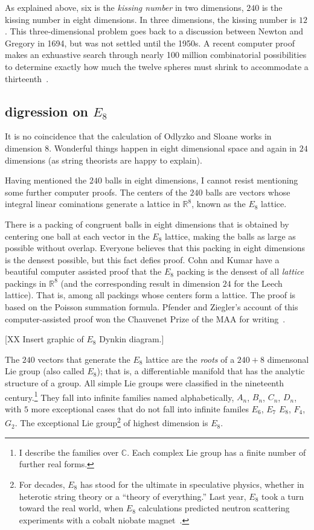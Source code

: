 \documentclass{llncs}
\newcommand{\ring}[1]{\mathbb{#1}}
\begin{document}
As explained above, six is the {\it kissing number} in two dimensions,
$240$ is the kissing number in eight dimensions. In three dimensions,
the kissing number is $12$.  This three-dimensional problem goes back
to a discussion between Newton and Gregory in 1694, but was not
settled until the 1950s.  A recent computer proof makes an exhuastive
search through nearly 100 million combinatorial possibilities to
determine exactly how much the twelve spheres must shrink to
accommodate a thirteenth~\cite{Musin-Tarasov}.



\subsection{digression on $E_8$}\label{sec:e8}

It is no coincidence that the calculation of Odlyzko and Sloane works
in dimension $8$.  Wonderful things happen in eight dimensional space
and again in $24$ dimensions (as string theorists are happy to
explain).

Having mentioned the $240$ balls in eight dimensions, I cannot resist
mentioning some further computer proofs.  The centers of the $240$ balls
are vectors whose integral linear cominations generate 
a lattice in $\ring{R}^8$, known as the $E_8$ lattice.

There is a packing of congruent balls in eight dimensions that is
obtained by centering one ball at each vector in the $E_8$ lattice,
making the balls as large as possible without overlap.  Everyone
believes that this packing in eight dimensions is the densest
possible, but this fact defies proof.  Cohn and Kumar have a beautiful
computer assisted proof that the $E_8$ packing is the densest of all
{\it lattice} packings in $\ring{R}^8$ (and the corresponding result in
dimension $24$ for the Leech lattice).  That is, among all packings
whose centers form a lattice.  The proof is based on the Poisson
summation formula.  Pfender and Ziegler's account of this
computer-assisted proof won the Chauvenet Prize of the MAA for
writing~\cite{PZ}.


[XX Insert graphic of $E_8$ Dynkin diagram.]

The $240$ vectors that generate the $E_8$ lattice are the {\it roots}
of a $240+8$ dimensonal Lie group (also called $E_8$); that is, a
differentiable manifold that has the analytic structure of a group.
All simple Lie groups were classified in the nineteenth
century.\footnote{I describe the families over $\ring{C}$.  Each
  complex Lie group has a finite number of further real forms.}  They
fall into infinite families named alphabetically, $A_n$, $B_n$, $C_n$,
$D_n$, with $5$ more exceptional cases that do not fall into infinite
familes $E_6$, $E_7$ $E_8$, $F_4$, $G_2$.  The exceptional Lie
group\footnote{For decades, $E_8$ has stood for the ultimate in
  speculative physics, whether in heterotic string theory or a
  ``theory of everything.''  Last year, $E_8$ took a turn toward the
  real world, when $E_8$ calculations predicted neutron scattering
  experiments with a cobalt niobate magnet~\cite{BGE8}.} of highest
dimension is $E_8$.
\end{document}
